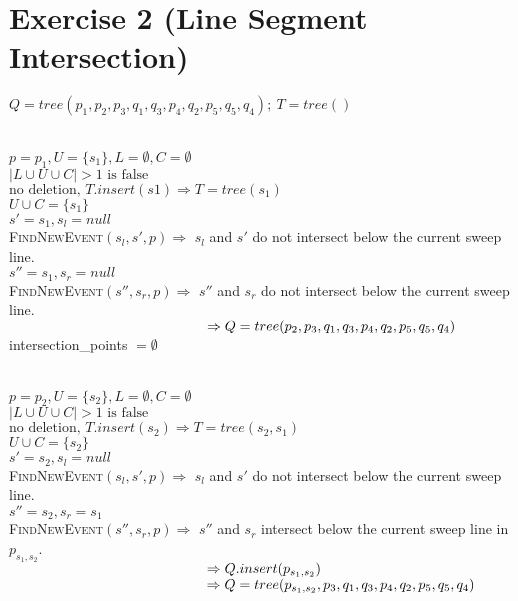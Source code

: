 \documentclass[english, fontsize=12pt, paper=a4, twoside=false, open=right, draft=true, pagesize=auto, version=last, DIV=16]{scrartcl}
\theoremstyle{break}
\begin{document}
\section*{Exercise 2 (Line Segment Intersection)}
$Q = tree(p_1,p_2,p_3,q_1,q_3,p_4,q_2,p_5,q_5,q_4); \ T = tree()$ \par
\vspace*{-3mm}
\hrulefill \\
$p = p_1, U = \{s_1\}, L=\emptyset, C=\emptyset$ \\
$|L \cup U \cup C|>1 \text{ is false}$ \\
$\text{no deletion, }T.insert(s1) \Rightarrow T=tree(s_1)$ \\
$U \cup C=\{s_1\}$ \\
$s'=s_1, s_l=null$ \\ 
{\scshape{FindNewEvent}}$(s_l,s',p) \Rightarrow$ $s_l$ and $s'$ do not intersect below the current sweep line. \\
$s''=s_1, s_r=null$ \\ 
{\scshape{FindNewEvent}}$(s'',s_r,p) \Rightarrow$ $s''$ and $s_r$ do not intersect below the current sweep line. \\
$\hspace*{49.5mm} \Rightarrow Q=tree(p_2,p_3,q_1,q_3,p_4,q_2,p_5,q_5,q_4)$ \\
intersection\_points $= \emptyset$ \par
\vspace*{-3mm}
\hrulefill \\
$p = p_2, U = \{s_2\}, L=\emptyset, C=\emptyset$ \\
$|L \cup U \cup C|>1 \text{ is false}$ \\
$\text{no deletion, }T.insert(s_2) \Rightarrow T=tree(s_2,s_1)$ \\
$U \cup C=\{s_2\}$ \\
$s'=s_2, s_l=null$ \\ 
{\scshape{FindNewEvent}}$(s_l,s',p) \Rightarrow$ $s_l$ and $s'$ do not intersect below the current sweep line. \\
$s''=s_2, s_r=s_1$ \\ 
{\scshape{FindNewEvent}}$(s'',s_r,p) \Rightarrow$ $s''$ and $s_r$ intersect below the current sweep line in $p_{s_1,s_2}$. \\
$\hspace*{49.5mm} \Rightarrow Q.insert(p_{s_1,s_2})$ \\
$\hspace*{49.5mm} \Rightarrow Q=tree(p_{s_1,s_2},p_3,q_1,q_3,p_4,q_2,p_5,q_5,q_4)$ \\
\end{document}
